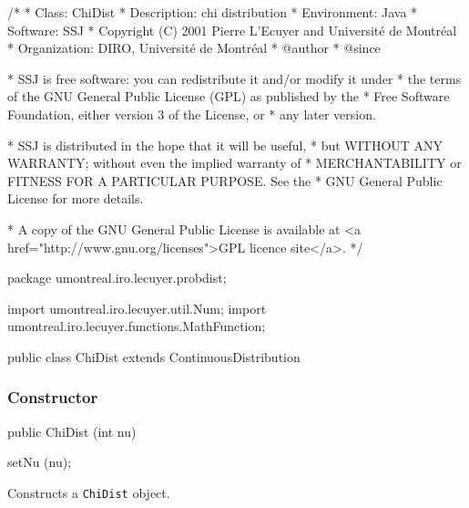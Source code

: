 \begin{code}
\begin{hide}
/*
 * Class:        ChiDist
 * Description:  chi distribution
 * Environment:  Java
 * Software:     SSJ 
 * Copyright (C) 2001  Pierre L'Ecuyer and Université de Montréal
 * Organization: DIRO, Université de Montréal
 * @author       
 * @since

 * SSJ is free software: you can redistribute it and/or modify it under
 * the terms of the GNU General Public License (GPL) as published by the
 * Free Software Foundation, either version 3 of the License, or
 * any later version.

 * SSJ is distributed in the hope that it will be useful,
 * but WITHOUT ANY WARRANTY; without even the implied warranty of
 * MERCHANTABILITY or FITNESS FOR A PARTICULAR PURPOSE.  See the
 * GNU General Public License for more details.

 * A copy of the GNU General Public License is available at
   <a href="http://www.gnu.org/licenses">GPL licence site</a>.
 */
\end{hide}
package umontreal.iro.lecuyer.probdist;\begin{hide}
import umontreal.iro.lecuyer.util.Num;
import umontreal.iro.lecuyer.functions.MathFunction;
\end{hide}

public class ChiDist extends ContinuousDistribution\begin{hide} {
   private int nu;
   private double C1;

   private static class Function implements MathFunction {
      protected int n;
      protected double sum;

      public Function (double s, int n)
      {
         this.n = n;
         this.sum = s;
      }

      public double evaluate (double k)
      {
         if (k < 1.0) return 1.0e200;
         return (sum + n * (Num.lnGamma (k / 2.0) - 0.5*(Num.LN2) - Num.lnGamma ((k + 1.0) / 2.0)));
      }
   }
\end{hide}
\end{code}
\subsubsection* {Constructor}

\begin{code}

   public ChiDist (int nu)\begin{hide} {
      setNu (nu);
   }\end{hide}
\end{code}
  \begin{tabb} Constructs a \texttt{ChiDist} object.
  \end{tabb}

